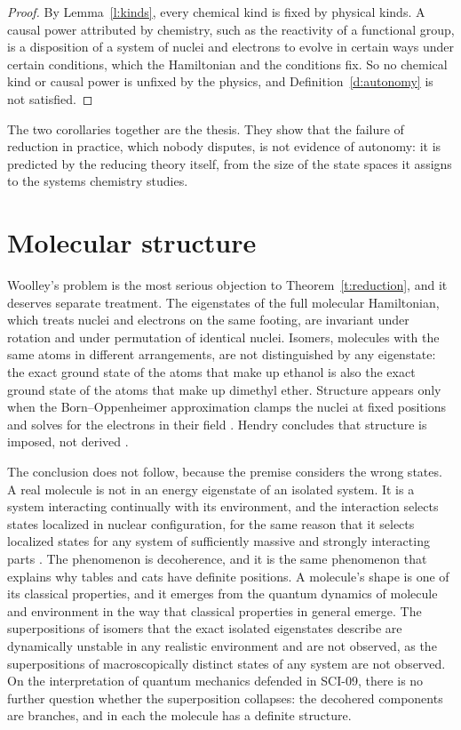 \documentclass{situationist-preprint}
\begin{document}
\begin{proof}
By Lemma~\ref{l:kinds}, every chemical kind is fixed by physical kinds. A causal power attributed by chemistry, such as the reactivity of a functional group, is a disposition of a system of nuclei and electrons to evolve in certain ways under certain conditions, which the Hamiltonian and the conditions fix. So no chemical kind or causal power is unfixed by the physics, and Definition~\ref{d:autonomy} is not satisfied.
\end{proof}

The two corollaries together are the thesis. They show that the failure of reduction in practice, which nobody disputes, is not evidence of autonomy: it is predicted by the reducing theory itself, from the size of the state spaces it assigns to the systems chemistry studies.

\section{Molecular structure}\label{s:structure}

Woolley's problem is the most serious objection to Theorem~\ref{t:reduction}, and it deserves separate treatment. The eigenstates of the full molecular Hamiltonian, which treats nuclei and electrons on the same footing, are invariant under rotation and under permutation of identical nuclei. Isomers, molecules with the same atoms in different arrangements, are not distinguished by any eigenstate: the exact ground state of the atoms that make up ethanol is also the exact ground state of the atoms that make up dimethyl ether. Structure appears only when the Born--Oppenheimer approximation clamps the nuclei at fixed positions and solves for the electrons in their field \citep{BornOppenheimer1927}. Hendry concludes that structure is imposed, not derived \citep{Hendry2010}.

The conclusion does not follow, because the premise considers the wrong states. A real molecule is not in an energy eigenstate of an isolated system. It is a system interacting continually with its environment, and the interaction selects states localized in nuclear configuration, for the same reason that it selects localized states for any system of sufficiently massive and strongly interacting parts \citep{Zurek2003}. The phenomenon is decoherence, and it is the same phenomenon that explains why tables and cats have definite positions. A molecule's shape is one of its classical properties, and it emerges from the quantum dynamics of molecule and environment in the way that classical properties in general emerge. The superpositions of isomers that the exact isolated eigenstates describe are dynamically unstable in any realistic environment and are not observed, as the superpositions of macroscopically distinct states of any system are not observed. On the interpretation of quantum mechanics defended in SCI-09, there is no further question whether the superposition collapses: the decohered components are branches, and in each the molecule has a definite structure.
\end{document}
